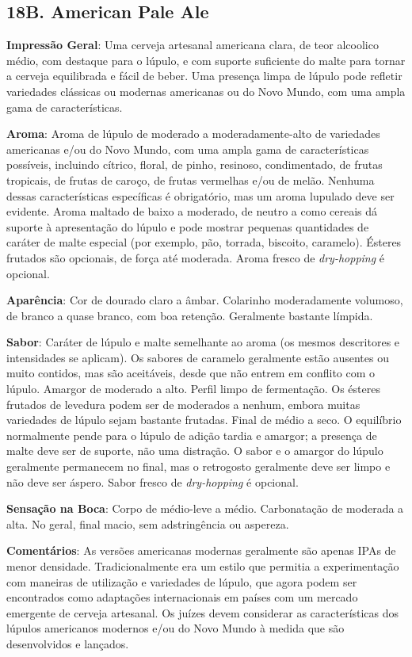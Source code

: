 \subsection*{18B. American Pale Ale}
\textbf{Impressão Geral}: Uma cerveja artesanal americana clara, de teor alcoolico médio, com destaque para o lúpulo, e com suporte suficiente do malte para tornar a cerveja equilibrada e fácil de beber. Uma presença limpa de lúpulo pode refletir variedades clássicas ou modernas americanas ou do Novo Mundo, com uma ampla gama de características.

\textbf{Aroma}: Aroma de lúpulo de moderado a moderadamente-alto de variedades americanas e/ou do Novo Mundo, com uma ampla gama de características possíveis, incluindo cítrico, floral, de pinho, resinoso, condimentado, de frutas tropicais, de frutas de caroço, de frutas vermelhas e/ou de melão. Nenhuma dessas características específicas é obrigatório, mas um aroma lupulado deve ser evidente. Aroma maltado de baixo a moderado, de neutro a como cereais dá suporte à apresentação do lúpulo e pode mostrar pequenas quantidades de caráter de malte especial (por exemplo, pão, torrada, biscoito, caramelo). Ésteres frutados são opcionais, de força até moderada. Aroma fresco de \textit{dry-hopping} é opcional.

\textbf{Aparência}: Cor de dourado claro a âmbar. Colarinho moderadamente volumoso, de branco a quase branco, com boa retenção. Geralmente bastante límpida.

\textbf{Sabor}: Caráter de lúpulo e malte semelhante ao aroma (os mesmos descritores e intensidades se aplicam). Os sabores de caramelo geralmente estão ausentes ou muito contidos, mas são aceitáveis, desde que não entrem em conflito com o lúpulo. Amargor de moderado a alto. Perfil limpo de fermentação. Os ésteres frutados de levedura podem ser de moderados a nenhum, embora muitas variedades de lúpulo sejam bastante frutadas. Final de médio a seco. O equilíbrio normalmente pende para o lúpulo de adição tardia e amargor; a presença de malte deve ser de suporte, não uma distração. O sabor e o amargor do lúpulo geralmente permanecem no final, mas o retrogosto geralmente deve ser limpo e não deve ser áspero. Sabor fresco de \textit{dry-hopping} é opcional.

\textbf{Sensação na Boca}: Corpo de médio-leve a médio. Carbonatação de moderada a alta. No geral, final macio, sem adstringência ou aspereza.

\textbf{Comentários}: As versões americanas modernas geralmente são apenas IPAs de menor densidade. Tradicionalmente era um estilo que permitia a experimentação com maneiras de utilização e variedades de lúpulo, que agora podem ser encontrados como adaptações internacionais em países com um mercado emergente de cerveja artesanal. Os juízes devem considerar as características dos lúpulos americanos modernos e/ou do Novo Mundo à medida que são desenvolvidos e lançados.

